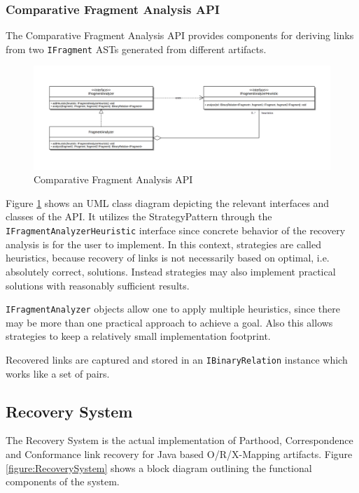 \subsubsection{Comparative Fragment Analysis API}
\label{subsubsection:ComparativeFragmentAnalysisAPI}
The Comparative Fragment Analysis \gls{API} provides components for deriving links from two \texttt{IFragment} \glspl{AST} generated from different artifacts.
\begin{figure}[h!]
\begin{center}
\includegraphics[width=\textwidth]{images/ComparativeFragmentAnalysisAPI.png}
\end{center}
\caption{Comparative Fragment Analysis API}
\label{figure:ComparativeFragmentAnalysisAPI}
\end{figure}
Figure \ref{figure:ComparativeFragmentAnalysisAPI} shows an \gls{UML} class diagram depicting the relevant interfaces and classes of the \gls{API}.
It utilizes the \gls{StrategyPattern} through the \texttt{IFragmentAnalyzerHeuristic} interface since concrete behavior of the recovery analysis is for the user to implement.
In this context, strategies are called heuristics, because recovery of links is not necessarily based on optimal, i.e. absolutely correct, solutions.
Instead strategies may also implement practical solutions with reasonably sufficient results.

\texttt{IFragmentAnalyzer} objects allow one to apply multiple heuristics, since there may be more than one practical approach to achieve a goal. Also this allows strategies to keep a relatively small implementation footprint.

Recovered links are captured and stored in an \texttt{IBinaryRelation} instance which works like a set of pairs.

\subsection{Recovery System}
\label{subsection:RecoverySystem}
The Recovery System is the actual implementation of \gls{Parthood}, \gls{Correspondence} and \gls{Conformance} link recovery for Java based \gls{O/R/X-Mapping} artifacts.
Figure \ref{figure:RecoverySystem} shows a block diagram outlining the functional components of the system.

